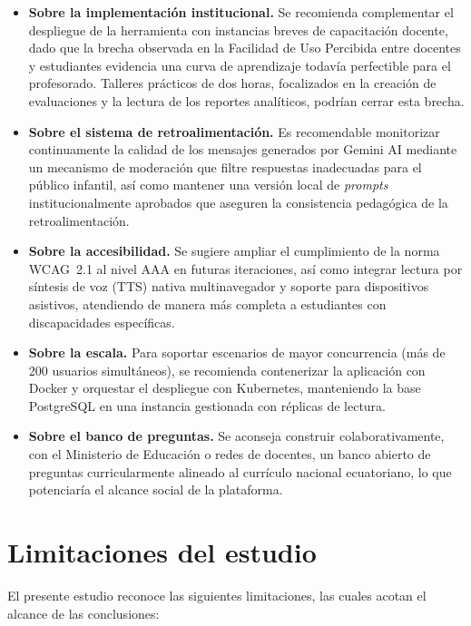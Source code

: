 \begin{itemize}[leftmargin=*]
\item \textbf{Sobre la implementación institucional.} Se recomienda complementar el despliegue de la herramienta con instancias breves de capacitación docente, dado que la brecha observada en la Facilidad de Uso Percibida entre docentes y estudiantes evidencia una curva de aprendizaje todavía perfectible para el profesorado. Talleres prácticos de dos horas, focalizados en la creación de evaluaciones y la lectura de los reportes analíticos, podrían cerrar esta brecha.

\item \textbf{Sobre el sistema de retroalimentación.} Es recomendable monitorizar continuamente la calidad de los mensajes generados por Gemini AI mediante un mecanismo de moderación que filtre respuestas inadecuadas para el público infantil, así como mantener una versión local de \textit{prompts} institucionalmente aprobados que aseguren la consistencia pedagógica de la retroalimentación.

\item \textbf{Sobre la accesibilidad.} Se sugiere ampliar el cumplimiento de la norma WCAG~2.1 al nivel AAA en futuras iteraciones, así como integrar lectura por síntesis de voz (TTS) nativa multinavegador y soporte para dispositivos asistivos, atendiendo de manera más completa a estudiantes con discapacidades específicas.

\item \textbf{Sobre la escala.} Para soportar escenarios de mayor concurrencia (más de 200 usuarios simultáneos), se recomienda contenerizar la aplicación con Docker y orquestar el despliegue con Kubernetes, manteniendo la base PostgreSQL en una instancia gestionada con réplicas de lectura.

\item \textbf{Sobre el banco de preguntas.} Se aconseja construir colaborativamente, con el Ministerio de Educación o redes de docentes, un banco abierto de preguntas curricularmente alineado al currículo nacional ecuatoriano, lo que potenciaría el alcance social de la plataforma.
\end{itemize}

\section{Limitaciones del estudio}

El presente estudio reconoce las siguientes limitaciones, las cuales acotan el alcance de las conclusiones:

